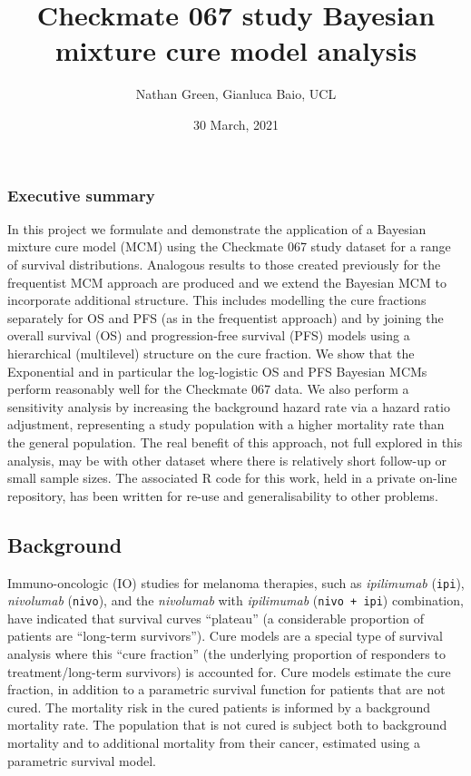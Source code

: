 \documentclass[
]{article}
\title{Checkmate 067 study Bayesian mixture cure model analysis}
\author{Nathan Green, Gianluca Baio, UCL}
\date{30 March, 2021}
\begin{document}
\maketitle

\hypertarget{executive-summary}{%
\subsubsection{Executive summary}\label{executive-summary}}

In this project we formulate and demonstrate the application of a
Bayesian mixture cure model (MCM) using the Checkmate 067 study dataset
for a range of survival distributions. Analogous results to those
created previously for the frequentist MCM approach are produced and we
extend the Bayesian MCM to incorporate additional structure. This
includes modelling the cure fractions separately for OS and PFS (as in
the frequentist approach) and by joining the overall survival (OS) and
progression-free survival (PFS) models using a hierarchical (multilevel)
structure on the cure fraction. We show that the Exponential and in
particular the log-logistic OS and PFS Bayesian MCMs perform reasonably
well for the Checkmate 067 data. We also perform a sensitivity analysis
by increasing the background hazard rate via a hazard ratio adjustment,
representing a study population with a higher mortality rate than the
general population. The real benefit of this approach, not full explored
in this analysis, may be with other dataset where there is relatively
short follow-up or small sample sizes. The associated R code for this
work, held in a private on-line repository, has been written for re-use
and generalisability to other problems.

\hypertarget{background}{%
\subsection{Background}\label{background}}

Immuno-oncologic (IO) studies for melanoma therapies, such as
\emph{ipilimumab} (\texttt{ipi}), \emph{nivolumab} (\texttt{nivo}), and
the \emph{nivolumab} with \emph{ipilimumab} (\texttt{nivo\ +\ ipi})
combination, have indicated that survival curves ``plateau'' (a
considerable proportion of patients are ``long-term survivors''). Cure
models are a special type of survival analysis where this ``cure
fraction'' (the underlying proportion of responders to
treatment/long-term survivors) is accounted for. Cure models estimate
the cure fraction, in addition to a parametric survival function for
patients that are not cured. The mortality risk in the cured patients is
informed by a background mortality rate. The population that is not
cured is subject both to background mortality and to additional
mortality from their cancer, estimated using a parametric survival
model.
\end{document}
